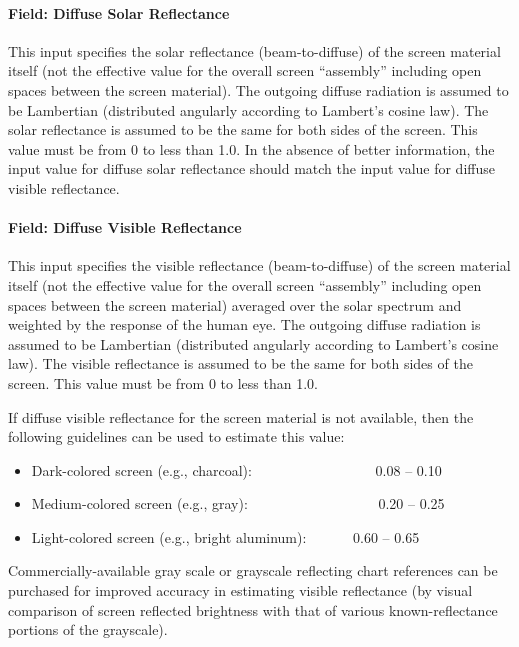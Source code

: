 \paragraph{Field: Diffuse Solar Reflectance}\label{field-diffuse-solar-reflectance}

This input specifies the solar reflectance (beam-to-diffuse) of the screen material itself (not the effective value for the overall screen ``assembly'' including open spaces between the screen material). The outgoing diffuse radiation is assumed to be Lambertian (distributed angularly according to Lambert's cosine law). The solar reflectance is assumed to be the same for both sides of the screen. This value must be from 0 to less than 1.0. In the absence of better information, the input value for diffuse solar reflectance should match the input value for diffuse visible reflectance.

\paragraph{Field: Diffuse Visible Reflectance}\label{field-diffuse-visible-reflectance}

This input specifies the visible reflectance (beam-to-diffuse) of the screen material itself (not the effective value for the overall screen ``assembly'' including open spaces between the screen material) averaged over the solar spectrum and weighted by the response of the human eye. The outgoing diffuse radiation is assumed to be Lambertian (distributed angularly according to Lambert's cosine law). The visible reflectance is assumed to be the same for both sides of the screen. This value must be from 0 to less than 1.0.

If diffuse visible reflectance for the screen material is not available, then the following guidelines can be used to estimate this value:

\begin{itemize}
\item
  Dark-colored screen (e.g., charcoal):~~~~~~~~~~~~~~~~~ 0.08 -- 0.10
\item
  Medium-colored screen (e.g., gray):~~~~~~~~~~~~~~~~~~ 0.20 -- 0.25
\item
  Light-colored screen (e.g., bright aluminum):~~~~~~ 0.60 -- 0.65
\end{itemize}

Commercially-available gray scale or grayscale reflecting chart references can be purchased for improved accuracy in estimating visible reflectance (by visual comparison of screen reflected brightness with that of various known-reflectance portions of the grayscale).


